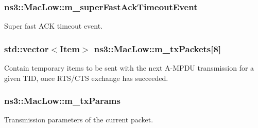 \subsubsection[{\texorpdfstring{m\+\_\+super\+Fast\+Ack\+Timeout\+Event}{m_superFastAckTimeoutEvent}}]{ ns3\+::\+Mac\+Low\+::m\+\_\+super\+Fast\+Ack\+Timeout\+Event\hspace{0.3cm}{\ttfamily [private]}}\hypertarget{classns3_1_1MacLow_ae2473406a32bcd2bd581a57da4683b18}{}\label{classns3_1_1MacLow_ae2473406a32bcd2bd581a57da4683b18}


Super fast A\+CK timeout event. 

\subsubsection[{\texorpdfstring{m\+\_\+tx\+Packets}{m_txPackets}}]{\setlength{\rightskip}{0pt plus 5cm}std\+::vector$<${\bf Item}$>$ ns3\+::\+Mac\+Low\+::m\+\_\+tx\+Packets\mbox{[}8\mbox{]}\hspace{0.3cm}{\ttfamily [private]}}\hypertarget{classns3_1_1MacLow_ab8e0468b74624573dc87630e41050206}{}\label{classns3_1_1MacLow_ab8e0468b74624573dc87630e41050206}


Contain temporary items to be sent with the next A-\/\+M\+P\+DU transmission for a given T\+ID, once R\+T\+S/\+C\+TS exchange has succeeded. 

\subsubsection[{\texorpdfstring{m\+\_\+tx\+Params}{m_txParams}}]{ ns3\+::\+Mac\+Low\+::m\+\_\+tx\+Params\hspace{0.3cm}{\ttfamily [private]}}\hypertarget{classns3_1_1MacLow_a1c5ce6a0415d4a6d394bc9fc8f78327d}{}\label{classns3_1_1MacLow_a1c5ce6a0415d4a6d394bc9fc8f78327d}


Transmission parameters of the current packet. 

